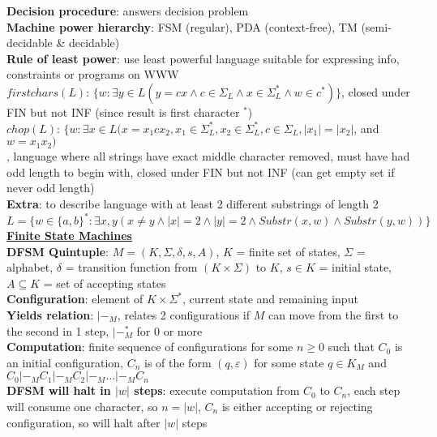 \documentclass[a4paper]{article}
\begin{document}
\begin{multicols}{2}
        \textbf{Decision procedure}: answers decision problem\\
        \textbf{Machine power hierarchy}: FSM (regular), PDA (context-free), TM (semi-decidable \& decidable)\\
        \textbf{Rule of least power}: use least powerful language suitable for expressing info, constraints or programs on WWW\\
        \boldmath$firstchars(L)$\unboldmath: $\{ w : \exists y \in L (y = cx \wedge c \in \Sigma _L \wedge x \in \Sigma _L^* \wedge w \in c^*) \}$, closed under FIN but not INF (since result is first character $^*$)\\
        \boldmath$chop(L)$\unboldmath: $\{ w : \exists x \in L (x = x_1 c x_2, x_1 \in \Sigma_L^*, x_2 \in \Sigma_L^*, c \in \Sigma_L, |x_1| = |x_2|$, and $w = x_1 x_2)$\\, language where all strings have exact middle character removed, must have had odd length to begin with, closed under FIN but not INF (can get empty set if never odd length)\\
        \textbf{Extra}: to describe language with at least 2 different substrings of length 2 $L = \{ w \in {\{a,b\}}^* : \exists x, y (x \neq y \wedge |x| = 2 \wedge |y| = 2 \wedge Substr(x,w) \wedge Substr(y,w)) \}$\\
        \underline{\textbf{Finite State Machines}}\\
        \textbf{DFSM Quintuple}: $M = (K, \Sigma, \delta, s, A)$, $K$ = finite set of states, $\Sigma$ = alphabet, $\delta$ = transition function from $(K \times \Sigma)$ to $K$, $s \in K$ = initial state, $A \subseteq K$ = set of accepting states\\
        \textbf{Configuration}: element of $K \times \Sigma^*$, current state and remaining input\\
        \textbf{Yields relation}: $|-_M$, relates 2 configurations if $M$ can move from the first to the second in 1 step, $|-_M^*$ for 0 or more\\
        \textbf{Computation}: finite sequence of configurations for some $n \geq 0$ such that $C_0$ is an initial configuration, $C_n$ is of the form $(q, \varepsilon)$ for some state $q \in K_M$ and $C_0 |-_M C_1 |-_M C_2 |-_M \ldots |-_M C_n$\\
        \textbf{DFSM will halt in $|w|$ steps}: execute computation from $C_0$ to $C_n$, each step will consume one character, so $n = |w|$, $C_n$ is either accepting or rejecting configuration, so will halt after $|w|$ steps\\

\end{multicols}
\end{document}
